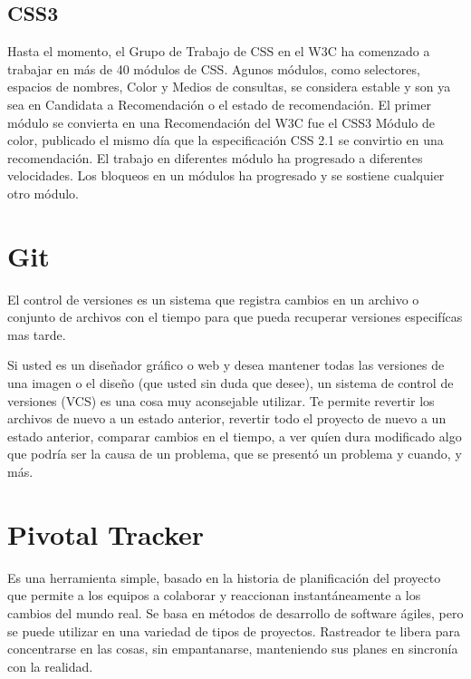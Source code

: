 \subsection{CSS3}

Hasta el momento, el Grupo de Trabajo de CSS en el W3C ha comenzado a trabajar 
en m\'{a}s de 40 m\'{o}dulos de CSS. Agunos m\'{o}dulos, como selectores, 
espacios de nombres, Color y Medios de consultas, se considera estable y son ya
sea en Candidata a Recomendaci\'{o}n o el estado de recomendaci\'{o}n. El primer
m\'{o}dulo se convierta en una Recomendaci\'{o}n del W3C fue el CSS3 M\'{o}dulo
de color, publicado el mismo d\'{i}a que la especificaci\'{o}n CSS 2.1 se convirtio
en una recomendaci\'{o}n. El trabajo en diferentes m\'{o}dulo ha progresado a 
diferentes velocidades. Los bloqueos en un m\'{o}dulos ha progresado y se sostiene
cualquier otro m\'{o}dulo.\cite{spurlock2013bootstrap}

\section{Git}

El control de versiones es un sistema que registra cambios en un archivo o conjunto
de archivos con el tiempo para que pueda recuperar versiones especif\'{i}cas mas tarde.

Si usted es un dise\~{n}ador gr\'{a}fico o web y desea mantener todas las versiones
de una imagen o el dise\~{n}o (que usted sin duda que desee), un sistema de control
de versiones (VCS) es una cosa muy aconsejable utilizar. Te permite revertir los
archivos de nuevo a un estado anterior, revertir todo el proyecto de nuevo a un
estado anterior, comparar cambios en el tiempo, a ver qu\'{i}en dura modificado
algo que podr\'{i}a ser la causa de un problema, que se present\'{o} un problema
y cuando, y m\'{a}s.\cite{chacon2009pro}

\section{Pivotal Tracker}

Es una herramienta simple, basado en la historia de planificaci\'{o}n del proyecto
que permite a los equipos a colaborar y reaccionan instant\'{a}neamente a los 
cambios del mundo real. Se basa en m\'{e}todos de desarrollo de software \'{a}giles,
pero se puede utilizar en una variedad de tipos de proyectos. Rastreador te libera
para concentrarse en las cosas, sin empantanarse, manteniendo sus planes en 
sincron\'{i}a con la realidad. \cite{pivotalTracker}